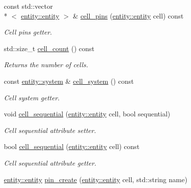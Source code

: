\begin{DoxyCompactItemize}
const std\-::vector\\*
$<$ \hyperlink{classophidian_1_1entity_1_1entity}{entity\-::entity} $>$ \& \hyperlink{classophidian_1_1standard__cell_1_1standard__cells_a0a6ad5354545086741534e1e5b963c61}{cell\-\_\-pins} (\hyperlink{classophidian_1_1entity_1_1entity}{entity\-::entity} cell) const 
\begin{DoxyCompactList}\small\item\em Cell pins getter. \end{DoxyCompactList}\item 
std\-::size\-\_\-t \hyperlink{classophidian_1_1standard__cell_1_1standard__cells_a704442c2289df257ab5cd779f1307eef}{cell\-\_\-count} () const 
\begin{DoxyCompactList}\small\item\em Returns the number of cells. \end{DoxyCompactList}\item 
const \hyperlink{classophidian_1_1entity_1_1system}{entity\-::system} \& \hyperlink{classophidian_1_1standard__cell_1_1standard__cells_a8c7ca7d653866b880df97a8f7b6998fb}{cell\-\_\-system} () const 
\begin{DoxyCompactList}\small\item\em Cell system getter. \end{DoxyCompactList}\item 
void \hyperlink{classophidian_1_1standard__cell_1_1standard__cells_a838f7cf223b913a996e0eb175a8ef4ae}{cell\-\_\-sequential} (\hyperlink{classophidian_1_1entity_1_1entity}{entity\-::entity} cell, bool sequential)
\begin{DoxyCompactList}\small\item\em Cell sequential attribute setter. \end{DoxyCompactList}\item 
bool \hyperlink{classophidian_1_1standard__cell_1_1standard__cells_a32f67b146acf6e185a54fb7e3e2711a5}{cell\-\_\-sequential} (\hyperlink{classophidian_1_1entity_1_1entity}{entity\-::entity} cell) const 
\begin{DoxyCompactList}\small\item\em Cell sequential attribute getter. \end{DoxyCompactList}\item 
\hyperlink{classophidian_1_1entity_1_1entity}{entity\-::entity} \hyperlink{classophidian_1_1standard__cell_1_1standard__cells_a38cf47d034e65203af44d506c0c536c8}{pin\-\_\-create} (\hyperlink{classophidian_1_1entity_1_1entity}{entity\-::entity} cell, std\-::string name)

\end{DoxyCompactItemize}
